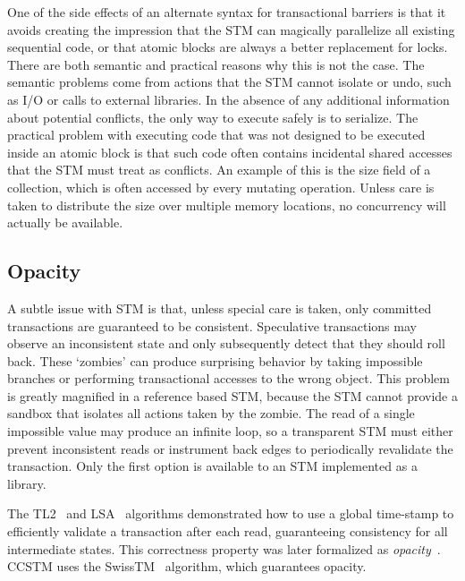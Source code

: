 One of the side effects of an alternate syntax for transactional barriers
is that it avoids creating the impression that the STM can magically
parallelize all existing sequential code, or that atomic blocks are
always a better replacement for locks.  There are both semantic and
practical reasons why this is not the case.  The semantic problems come
from actions that the STM cannot isolate or undo, such as I/O or calls to
external libraries.  In the absence of any additional information about
potential conflicts, the only way to execute safely is to serialize.
The practical problem with executing code that was not designed to
be executed inside an atomic block is that such code often contains
incidental shared accesses that the STM must treat as conflicts.
An example of this is the size field of a collection, which is often
accessed by every mutating operation.  Unless care is taken to distribute
the size over multiple memory locations, no concurrency will actually
be available.

\subsection{Opacity}

A subtle issue with STM is that, unless special care is taken, only
committed transactions are guaranteed to be consistent.  Speculative
transactions may observe an inconsistent state and only subsequently
detect that they should roll back.  These `zombies' can produce
surprising behavior by taking impossible branches or performing
transactional accesses to the wrong object.  This problem is greatly
magnified in a reference based STM, because the STM cannot provide a
sandbox that isolates all actions taken by the zombie.  The read of a
single impossible value may produce an infinite loop, so a transparent
STM must either prevent inconsistent reads or instrument back edges
to periodically revalidate the transaction.  Only the first option is
available to an STM implemented as a library.

The TL2~\cite{dice06tl2} and LSA~\cite{riegel06lsa} algorithms
demonstrated how to use a global time-stamp to efficiently validate
a transaction after each read, guaranteeing consistency for all
intermediate states.  This correctness property was later formalized
as \textit{opacity}~\cite{guerraoui08opacity}.  CCSTM uses the
SwissTM~\cite{swisstm} algorithm, which guarantees opacity.

